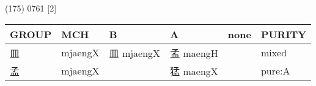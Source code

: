 \documentclass[14pt,a4paper]{scrartcl}
\begin{document}
(175) 0761 {[}2{]}

\begin{longtable}[c]{@{}llllll@{}}
\toprule
\begin{minipage}[b]{0.14\columnwidth}\raggedright\strut
GROUP
\strut\end{minipage} &
\begin{minipage}[b]{0.14\columnwidth}\raggedright\strut
MCH
\strut\end{minipage} &
\begin{minipage}[b]{0.14\columnwidth}\raggedright\strut
B
\strut\end{minipage} &
\begin{minipage}[b]{0.14\columnwidth}\raggedright\strut
A
\strut\end{minipage} &
\begin{minipage}[b]{0.14\columnwidth}\raggedright\strut
none
\strut\end{minipage} &
\begin{minipage}[b]{0.14\columnwidth}\raggedright\strut
PURITY
\strut\end{minipage}\tabularnewline
\midrule
\endhead
\begin{minipage}[t]{0.14\columnwidth}\raggedright\strut
皿
\strut\end{minipage} &
\begin{minipage}[t]{0.14\columnwidth}\raggedright\strut
mjaengX
\strut\end{minipage} &
\begin{minipage}[t]{0.14\columnwidth}\raggedright\strut
皿 mjaengX
\strut\end{minipage} &
\begin{minipage}[t]{0.14\columnwidth}\raggedright\strut
孟 maengH
\strut\end{minipage} &
\begin{minipage}[t]{0.14\columnwidth}\raggedright\strut
\strut\end{minipage} &
\begin{minipage}[t]{0.14\columnwidth}\raggedright\strut
mixed
\strut\end{minipage}\tabularnewline
\begin{minipage}[t]{0.14\columnwidth}\raggedright\strut
孟
\strut\end{minipage} &
\begin{minipage}[t]{0.14\columnwidth}\raggedright\strut
mjaengX
\strut\end{minipage} &
\begin{minipage}[t]{0.14\columnwidth}\raggedright\strut
\strut\end{minipage} &
\begin{minipage}[t]{0.14\columnwidth}\raggedright\strut
猛 maengX
\strut\end{minipage} &
\begin{minipage}[t]{0.14\columnwidth}\raggedright\strut
\strut\end{minipage} &
\begin{minipage}[t]{0.14\columnwidth}\raggedright\strut
pure:A
\strut\end{minipage}\tabularnewline
\bottomrule
\end{longtable}
\end{document}
